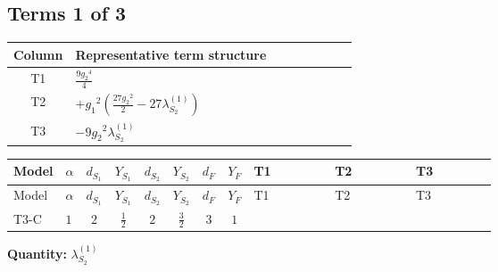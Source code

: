 \documentclass[8pt]{article}
\begin{document}
\begin{landscape}
\subsection*{Terms 1 of 3}
\begin{center}
\begin{tabular}{@{}c >{\raggedright\arraybackslash}p{0.82\linewidth}@{}}
\toprule
Column & Representative term structure \\
\midrule
T1 & \(\displaystyle \frac{9 {g_2}^4}{4}\) \\
\midrule
T2 & \(\displaystyle +{g_1}^2 \left(\frac{27 {g_2}^2}{2}-27 {\lambda_{S_2}^{(1)}}\right)\) \\
\midrule
T3 & \(\displaystyle -9 {g_2}^2 {\lambda_{S_2}^{(1)}}\) \\
\midrule
\bottomrule
\end{tabular}
\end{center}
\smallskip
\tiny
\begin{longtable}{@{}llcccccc >{\raggedright\arraybackslash}p{0.21\linewidth} >{\raggedright\arraybackslash}p{0.21\linewidth} >{\raggedright\arraybackslash}p{0.21\linewidth}@{}}
\toprule
Model & $\alpha$ & $d_{S_1}$ & $Y_{S_1}$ & $d_{S_2}$ & $Y_{S_2}$ & $d_F$ & $Y_F$ & T1 & T2 & T3 \\
\midrule
\endfirsthead
\toprule
Model & $\alpha$ & $d_{S_1}$ & $Y_{S_1}$ & $d_{S_2}$ & $Y_{S_2}$ & $d_F$ & $Y_F$ & T1 & T2 & T3 \\
\midrule
\endhead
T3-C & $1$ & $2$ & $\frac{1}{2}$ & $2$ & $\frac{3}{2}$ & $3$ & $1$ & \scriptsize\adjustbox{max width=\linewidth}{$\begin{gathered} \frac{9 {g_2}^4}{4}\end{gathered}$} & \scriptsize\adjustbox{max width=\linewidth}{$\begin{gathered} +{g_1}^2 \left(\frac{27 {g_2}^2}{2}-27 {\lambda_{S_2}^{(1)}}\right)\end{gathered}$} & \scriptsize\adjustbox{max width=\linewidth}{$\begin{gathered} -9 {g_2}^2 {\lambda_{S_2}^{(1)}}\end{gathered}$} \\
\midrule
\bottomrule
\end{longtable}
\clearpage
\noindent\textbf{Quantity: }$\lambda_{S_2}^{(1)}$\par\smallskip

\end{landscape}
\end{document}
